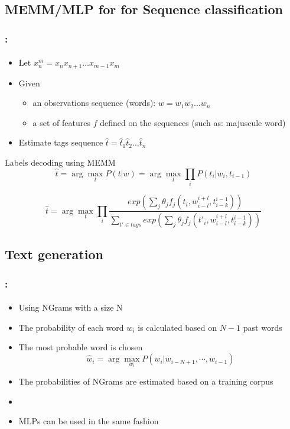 \documentclass[xcolor=table]{beamer}
\begin{document}
\subsection{MEMM/MLP for for Sequence classification}

\begin{frame}
	\frametitle{\insertshortsubtitle: \insertsection}
	\framesubtitle{\insertsubsection}
	
	\begin{itemize}
			\item Let $x_{n}^{m} = x_n x_{n+1} \ldots x_{m-1} x_m$
			\item Given 
			\begin{itemize}
					\item an observations sequence (words): $w = w_1 w_2 \ldots w_n$
					\item a set of features $f$ defined on the sequences (such as: majuscule word)
				\end{itemize}
			\item Estimate tags sequence $\hat{t} = \hat{t}_1 \hat{t}_2 \ldots \hat{t}_n$
		\end{itemize}
	
	\begin{block}{Labels decoding using MEMM}
			\[
			\hat{t} = \arg\max\limits_t P(t | w) = \arg\max\limits_t \prod\limits_{i}  P(t_i | w_i, t_{i-1})
			\]
			
			\[
			\hat{t} = \arg\max\limits_t \prod\limits_{i}  
			\frac{exp\left(\sum_j \theta_j f_j(t_i, w_{i-l}^{i+l}, t_{i-k}^{i-1})\right)}%
			{\sum_{t' \in tags} exp\left(\sum_j \theta_j f_j(t'_i, w_{i-l}^{i+l}, t_{i-k}^{i-1})\right)}
			\]
		\end{block}
	
\end{frame}


\subsection{Text generation}

\begin{frame}
	\frametitle{\insertshortsubtitle: \insertsection}
	\framesubtitle{\insertsubsection}
	
	\begin{itemize}
		\item Using NGrams with a size N
		\item The probability of each word $ w_i $ is calculated based on $N-1$ past words
		\item The most probable word is chosen
		\[\hat{w}_i = \arg\max\limits_{w_i} P(w_i | w_{i-N+1}, \cdots, w_{i-1})\]
		\item The probabilities of NGrams are estimated based on a training corpus
		\item {}
		\item MLPs can be used in the same fashion
	\end{itemize}
	
\end{frame}
\end{document}
